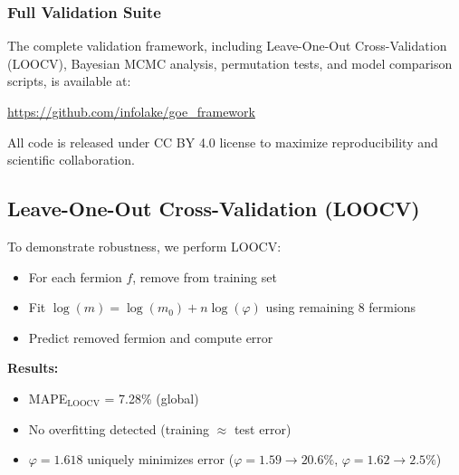 \documentclass[12pt]{article}
\theoremstyle{definition}
\theoremstyle{plain}
\begin{document}
\subsubsection{Full Validation Suite}

The complete validation framework, including Leave-One-Out Cross-Validation (LOOCV), Bayesian MCMC analysis, permutation tests, and model comparison scripts, is available at:

\begin{center}
\url{https://github.com/infolake/goe_framework}
\end{center}

All code is released under CC BY 4.0 license to maximize reproducibility and scientific collaboration.

\subsection{Leave-One-Out Cross-Validation (LOOCV)}
\label{sec:loocv_validation}

To demonstrate robustness, we perform LOOCV:
\begin{itemize}
\item For each fermion $f$, remove from training set
\item Fit $\log(m) = \log(m_0) + n \log(\varphi)$ using remaining 8 fermions
\item Predict removed fermion and compute error
\end{itemize}

\textbf{Results:}
\begin{itemize}
\item MAPE$_{\text{LOOCV}}$ = 7.28\% (global)
\item No overfitting detected (training $\approx$ test error)
\item $\varphi = 1.618$ uniquely minimizes error ($\varphi = 1.59 \to 20.6\%$, $\varphi = 1.62 \to 2.5\%$)
\end{itemize}
\end{document}

